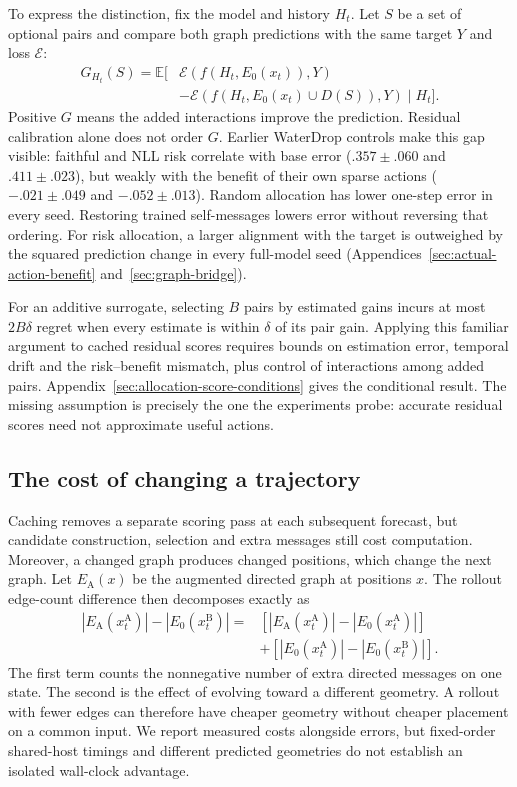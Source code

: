 To express the distinction, fix the model and history $H_t$. Let $S$ be a set of optional pairs and compare both graph predictions with the same target $Y$ and loss $\mathcal E$:
\begin{align}
 G_{H_t}(S)=\mathbb E[&\mathcal E(f(H_t,E_0(x_t)),Y)\nonumber\\
              &-\mathcal E(f(H_t,E_0(x_t)\cup D(S)),Y)\mid H_t].
\end{align}
Positive $G$ means the added interactions improve the prediction. Residual calibration alone does not order $G$. Earlier WaterDrop controls make this gap visible: faithful and NLL risk correlate with base error ($.357\pm.060$ and $.411\pm.023$), but weakly with the benefit of their own sparse actions ($-.021\pm.049$ and $-.052\pm.013$). Random allocation has lower one-step error in every seed. Restoring trained self-messages lowers error without reversing that ordering. For risk allocation, a larger alignment with the target is outweighed by the squared prediction change in every full-model seed (Appendices~\ref{sec:actual-action-benefit} and~\ref{sec:graph-bridge}).

For an additive surrogate, selecting $B$ pairs by estimated gains incurs at most $2B\delta$ regret when every estimate is within $\delta$ of its pair gain. Applying this familiar argument to cached residual scores requires bounds on estimation error, temporal drift and the risk--benefit mismatch, plus control of interactions among added pairs. Appendix~\ref{sec:allocation-score-conditions} gives the conditional result. The missing assumption is precisely the one the experiments probe: accurate residual scores need not approximate useful actions.

\subsection{The cost of changing a trajectory}
Caching removes a separate scoring pass at each subsequent forecast, but candidate construction, selection and extra messages still cost computation. Moreover, a changed graph produces changed positions, which change the next graph. Let $E_{\mathrm A}(x)$ be the augmented directed graph at positions $x$. The rollout edge-count difference then decomposes exactly as
\begin{align}
 |E_{\mathrm A}(x_t^{\mathrm A})|-|E_0(x_t^{\mathrm B})|
 ={}&[|E_{\mathrm A}(x_t^{\mathrm A})|-|E_0(x_t^{\mathrm A})|]\nonumber\\
 &+[|E_0(x_t^{\mathrm A})|-|E_0(x_t^{\mathrm B})|].
 \label{eq:decomposition}
\end{align}
The first term counts the nonnegative number of extra directed messages on one state. The second is the effect of evolving toward a different geometry. A rollout with fewer edges can therefore have cheaper geometry without cheaper placement on a common input. We report measured costs alongside errors, but fixed-order shared-host timings and different predicted geometries do not establish an isolated wall-clock advantage.

